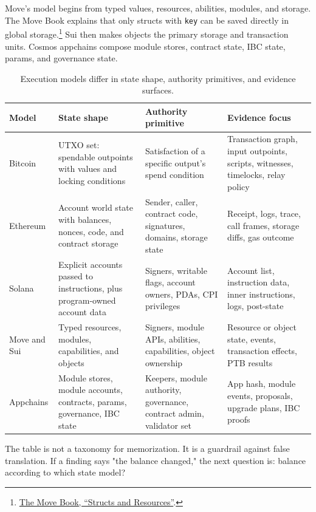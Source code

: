Move's model begins from typed values, resources, abilities, modules, and storage. The Move Book explains that only structs with \texttt{key} can be saved directly in global storage.\footnote{\href{https://move-language.github.io/move/structs-and-resources.html}{The Move Book, ``Structs and Resources''}.} Sui then makes objects the primary storage and transaction units. Cosmos appchains compose module stores, contract state, IBC state, params, and governance state.

\begin{table}[htbp]
\centering
\small
\renewcommand{\arraystretch}{1.18}
\begin{tabularx}{\textwidth}{@{}>{\RaggedRight\arraybackslash}p{}>{\RaggedRight\arraybackslash}p{}>{\RaggedRight\arraybackslash}p{}>{\RaggedRight\arraybackslash}X@{}}
\toprule
Model & State shape & Authority primitive & Evidence focus \\
\midrule
Bitcoin & UTXO set: spendable outpoints with values and locking conditions & Satisfaction of a specific output's spend condition & Transaction graph, input outpoints, scripts, witnesses, timelocks, relay policy \\
Ethereum & Account world state with balances, nonces, code, and contract storage & Sender, caller, contract code, signatures, domains, storage state & Receipt, logs, trace, call frames, storage diffs, gas outcome \\
Solana & Explicit accounts passed to instructions, plus program-owned account data & Signers, writable flags, account owners, PDAs, CPI privileges & Account list, instruction data, inner instructions, logs, post-state \\
Move and Sui & Typed resources, modules, capabilities, and objects & Signers, module APIs, abilities, capabilities, object ownership & Resource or object state, events, transaction effects, PTB results \\
Appchains & Module stores, module accounts, contracts, params, governance, IBC state & Keepers, module authority, governance, contract admin, validator set & App hash, module events, proposals, upgrade plans, IBC proofs \\
\bottomrule
\end{tabularx}
\caption{Execution models differ in state shape, authority primitives, and evidence surfaces.}
\end{table}

The table is not a taxonomy for memorization. It is a guardrail against false translation. If a finding says "the balance changed," the next question is: balance according to which state model?

